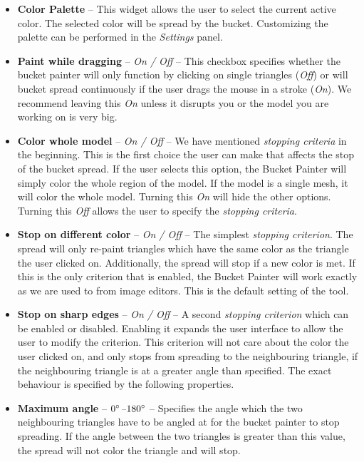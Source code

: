 \begin{itemize}
\item \textbf{Color Palette} -- This widget allows the user to select the current active color. The selected color will be spread by the bucket. Customizing the palette can be performed in the \textit{Settings} panel.

\item \textbf{Paint while dragging} -- \textit{On / Off} -- This checkbox specifies whether the bucket painter will only function by clicking on single triangles (\textit{Off}) or will bucket spread continuously if the user drags the mouse in a stroke (\textit{On}). We recommend leaving this \textit{On} unless it disrupts you or the model you are working on is very big.

\item \textbf{Color whole model} -- \textit{On / Off} -- We have mentioned \textit{stopping criteria} in the beginning. This is the  first choice the user can make that affects the stop of the bucket spread. If the user selects this option, the Bucket Painter will simply color the whole region of the model. If the model is a single mesh, it will color the whole model. Turning this \textit{On} will hide the other options. Turning this \textit{Off} allows the user to specify the \textit{stopping criteria}.

\item \textbf{Stop on different color} -- \textit{On / Off} -- The simplest \textit{stopping criterion}. The spread will only re-paint triangles which have the same color as the triangle the user clicked on. Additionally, the spread will stop if a new color is met. If this is the only criterion that is enabled, the Bucket Painter will work exactly as we are used to from image editors. This is the default setting of the tool.

\item \textbf{Stop on sharp edges} -- \textit{On / Off} -- A second \textit{stopping criterion} which can be enabled or disabled. Enabling it expands the user interface to allow the user to modify the criterion. This criterion will not care about the color the user clicked on, and only stops from spreading to the neighbouring triangle, if the neighbouring triangle is at a greater angle than specified. The exact behaviour is specified by the following properties.

\item \textbf{Maximum angle} -- \textit{$0\degree$--$180\degree$} -- Specifies the angle which the two neighbouring triangles have to be angled at for the bucket painter to stop spreading. If the angle between the two triangles is greater than this value, the spread will not color the triangle and will stop.


\end{itemize}
